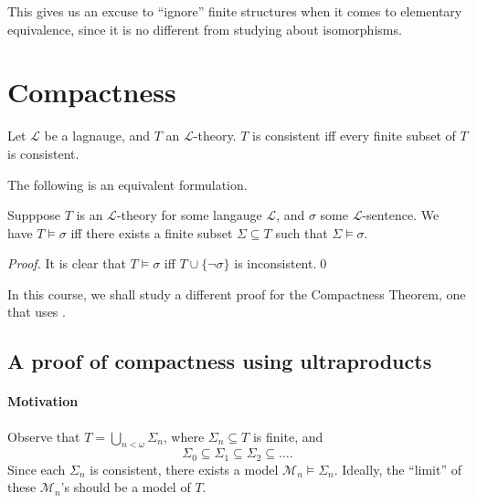 \documentclass[notoc,notitlepage]{tufte-book}
\begin{document}
\begin{remark}
  This gives us an excuse to ``ignore'' finite structures when it comes to elementary equivalence, since it is no different from studying about isomorphisms.
\end{remark}



\section{Compactness}%
\label{sec:compactness}

\begin{thm}\label{thm:compactness_theorem}
  Let $\mathcal{L}$ be a lagnauge, and $T$ an $\mathcal{L}$-theory. $T$ is consistent iff every finite subset of $T$ is consistent. 
\end{thm}

The following is an equivalent formulation.

\begin{crly}\label{crly:corollary_of_compactness_theorem}
  Supppose $T$ is an $\mathcal{L}$-theory for some langauge $\mathcal{L}$, and $\sigma$ some $\mathcal{L}$-sentence. We have $T \models \sigma$ iff there exists a finite subset $\Sigma \subseteq T$ such that $\Sigma \models \sigma$.
\end{crly}

\begin{proof}
  It is clear that $T \models \sigma$ iff $T \cup \{ \neg \sigma \}$ is inconsistent.\qed\
\end{proof}

In this course, we shall study a different proof for the Compactness Theorem, one that uses .

\subsection{A proof of compactness using ultraproducts}%
\label{sub:a_proof_of_compactness_using_ultraproducts}

\paragraph{Motivation} Observe that $T = \bigcup_{n < \omega} \Sigma_n$, where $\Sigma_n \subseteq T$ is finite, and
\begin{equation*}
  \Sigma_0 \subseteq \Sigma_1 \subseteq \Sigma_2 \subseteq \hdots.
\end{equation*}
Since each $\Sigma_n$ is consistent, there exists a model $\mathcal{M}_n \models \Sigma_n$. Ideally, the ``limit'' of these $\mathcal{M}_n$'s should be a model of $T$.
\end{document}
